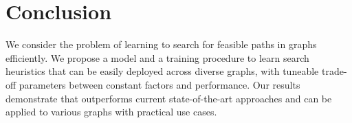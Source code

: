 \section{Conclusion}

We consider the problem of learning to search for feasible paths in graphs efficiently. We propose a model and a training procedure to learn search heuristics that can be easily deployed across diverse graphs, with tuneable trade-off parameters between constant factors and performance. Our results demonstrate that \phil outperforms current state-of-the-art approaches and can be applied to various graphs with practical use cases.
